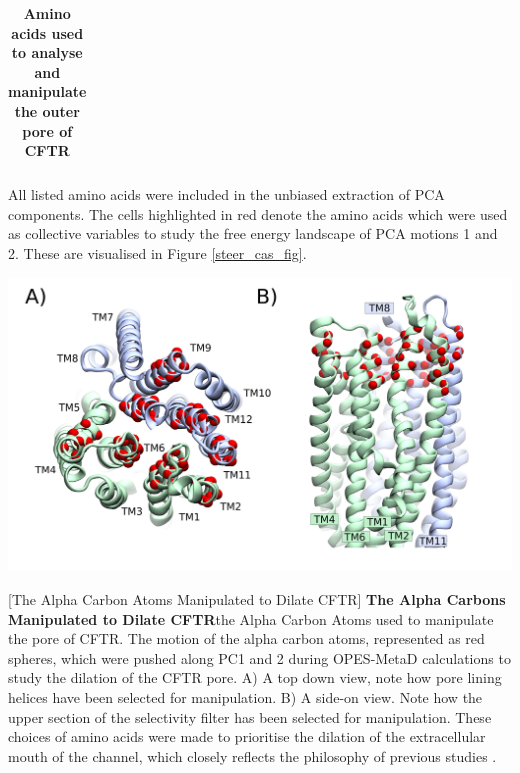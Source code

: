 \begin{table}
\begin{center}
{\begin{tabular} {| c | c | c | c | c | c | c | c | c | c | c | c | }
            



\end{tabular}%
}
\end{center}
\captionsetup{singlelinecheck = false, justification=raggedright}                           
\caption[Amino acids used to analyse and manipulate the outer pore of CFTR] {\textbf{Amino acids used to analyse and manipulate the outer pore of CFTR}}{All listed amino acids were included in the unbiased extraction of PCA components. The cells highlighted in red denote the amino acids which were used as collective variables to study the free energy landscape of PCA motions 1 and 2. These are visualised in Figure \ref{steer_cas_fig}. }

\label{red_alpha_carbons_table}
\end{table}

\begingroup
	\begin{center}
		\includegraphics[width=1\textwidth]{figures/opening/steer_cas.pdf}
	\end{center}
	\captionsetup{singlelinecheck = false, justification=raggedright}
	[The Alpha Carbon Atoms Manipulated to Dilate CFTR] {\textbf{The Alpha Carbons Manipulated to Dilate CFTR}}{the Alpha Carbon Atoms used to manipulate the pore of CFTR. The motion of the alpha carbon atoms, represented as red spheres, which were pushed along PC1 and 2 during OPES-MetaD calculations to study the dilation of the CFTR pore. A) A top down view, note how pore lining helices have been selected for manipulation. B) A side-on view. Note how the upper section of the selectivity filter has been selected for manipulation. These choices of amino acids were made to prioritise the dilation of the extracellular mouth of the channel, which closely reflects the philosophy of previous studies \cite{hoffmann2018}. } 
	\label{steer_cas_fig}
\endgroup

